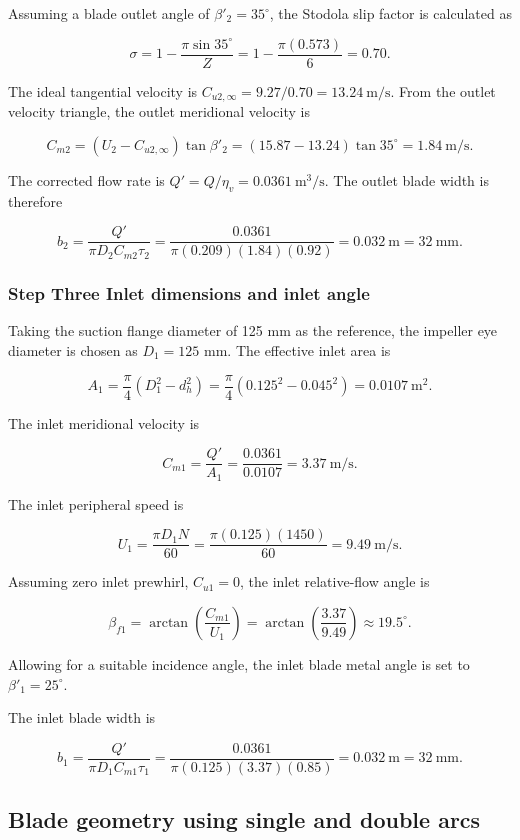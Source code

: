 \documentclass[11pt,a4paper]{article}
\begin{document}
Assuming a blade outlet angle of $\beta'_2=35^\circ$, the Stodola slip factor is calculated as

\[\sigma=1-\frac{\pi\sin35^\circ}{Z}=1-\frac{\pi(0.573)}{6}=0.70.\]

The ideal tangential velocity is $C_{u2,\infty}=9.27/0.70=13.24\ \mathrm{m/s}$. From the outlet velocity triangle, the outlet meridional velocity is

\[C_{m2}=(U_2-C_{u2,\infty})\tan\beta'_2=(15.87-13.24)\tan35^\circ=1.84\ \mathrm{m/s}.\]

The corrected flow rate is $Q'=Q/\eta_v=0.0361\ \mathrm{m^3/s}$. The outlet blade width is therefore

\[b_2=\frac{Q'}{\pi D_2 C_{m2}\tau_2}=\frac{0.0361}{\pi(0.209)(1.84)(0.92)}=0.032\ \mathrm{m}=32\ \mathrm{mm}.\]

\subsubsection{Step Three Inlet dimensions and inlet angle}

Taking the suction flange diameter of 125 mm as the reference, the impeller eye diameter is chosen as $D_1=125$ mm. The effective inlet area is

\[A_1=\frac{\pi}{4}(D_1^2-d_h^2)=\frac{\pi}{4}(0.125^2-0.045^2)=0.0107\ \mathrm{m^2}.\]

The inlet meridional velocity is

\[C_{m1}=\frac{Q'}{A_1}=\frac{0.0361}{0.0107}=3.37\ \mathrm{m/s}.\]

The inlet peripheral speed is

\[U_1=\frac{\pi D_1N}{60}=\frac{\pi(0.125)(1450)}{60}=9.49\ \mathrm{m/s}.\]

Assuming zero inlet prewhirl, $C_{u1}=0$, the inlet relative-flow angle is

\[\beta_{f1}=\arctan\left(\frac{C_{m1}}{U_1}\right)=\arctan\left(\frac{3.37}{9.49}\right)\approx19.5^\circ.\]

Allowing for a suitable incidence angle, the inlet blade metal angle is set to $\beta'_1=25^\circ$.

The inlet blade width is

\[b_1=\frac{Q'}{\pi D_1 C_{m1}\tau_1}=\frac{0.0361}{\pi(0.125)(3.37)(0.85)}=0.032\ \mathrm{m}=32\ \mathrm{mm}.\]

\subsection{Blade geometry using single and double arcs}
\end{document}
